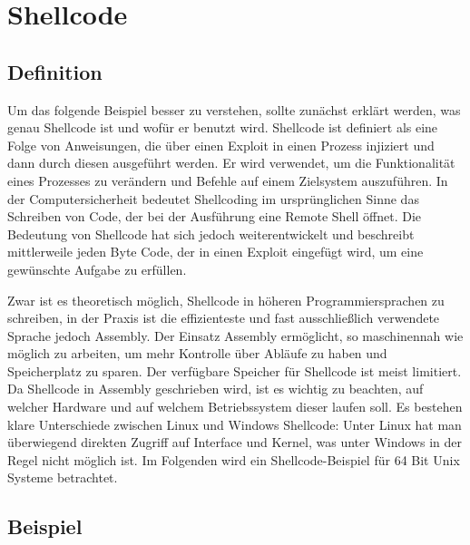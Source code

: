 \section{Shellcode} \label{sec:shellcode}
\subsection{Definition}
Um das folgende Beispiel besser zu verstehen, sollte zunächst erklärt werden, was genau Shellcode ist und wofür er benutzt wird.
Shellcode ist definiert als eine Folge von Anweisungen, die über einen Exploit in einen Prozess injiziert und
dann durch diesen ausgeführt werden. Er wird verwendet, um die Funktionalität eines Prozesses zu verändern und
Befehle auf einem Zielsystem auszuführen. In der Computersicherheit bedeutet Shellcoding im ursprünglichen Sinne
das Schreiben von Code, der bei der Ausführung eine Remote Shell öffnet. Die Bedeutung von Shellcode hat sich jedoch weiterentwickelt und
beschreibt mittlerweile jeden Byte Code, der in einen Exploit eingefügt wird, um eine gewünschte Aufgabe zu erfüllen.

Zwar ist es theoretisch möglich, Shellcode in höheren Programmiersprachen zu schreiben, in der Praxis ist die effizienteste und
fast ausschließlich verwendete Sprache jedoch Assembly. Der Einsatz Assembly ermöglicht, so maschinennah wie möglich zu arbeiten,
um mehr Kontrolle über Abläufe zu haben und Speicherplatz zu sparen. Der verfügbare Speicher für Shellcode ist meist limitiert.
Da Shellcode in Assembly geschrieben wird, ist es wichtig zu beachten, auf welcher Hardware und auf welchem Betriebssystem dieser laufen soll.
Es bestehen klare Unterschiede zwischen Linux und Windows Shellcode: Unter Linux hat man überwiegend direkten Zugriff auf Interface und Kernel,
was unter Windows in der Regel nicht möglich ist. Im Folgenden wird ein Shellcode-Beispiel für 64 Bit Unix Systeme betrachtet. \cite{tutorial1}

\subsection{Beispiel}

